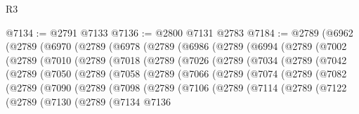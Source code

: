 \begin{lexlean}{R3}
\begin{coremodule}
@7134 := @2791 @7133
@7136 := @2800 @7131 @2783
@7184 := @2789
    (@6962
      (@2789
        (@6970
          (@2789
            (@6978
              (@2789
                (@6986
                  (@2789
                    (@6994
                      (@2789
                        (@7002
                          (@2789
                            (@7010
                              (@2789
                                (@7018
                                  (@2789
                                    (@7026
                                      (@2789
                                        (@7034
                                          (@2789
                                            (@7042
                                              (@2789
                                                (@7050
                                                  (@2789
                                                    (@7058
                                                      (@2789
                                                        (@7066
                                                          (@2789
                                                            (@7074
                                                              (@2789
                                                                (@7082
                                                                  (@2789
                                                                    (@7090
                                                                      (@2789
                                                                        (@7098
                                                                          (@2789
                                                                            (@7106
                                                                              (@2789
                                                                                (@7114
                                                                                  (@2789
                                                                                    (@7122
                                                                                      (@2789
                                                                                        (@7130
                                                                                          (@2789
                                                                                            (@7134
                                                                                              @7136

\end{coremodule}
\end{lexlean}
